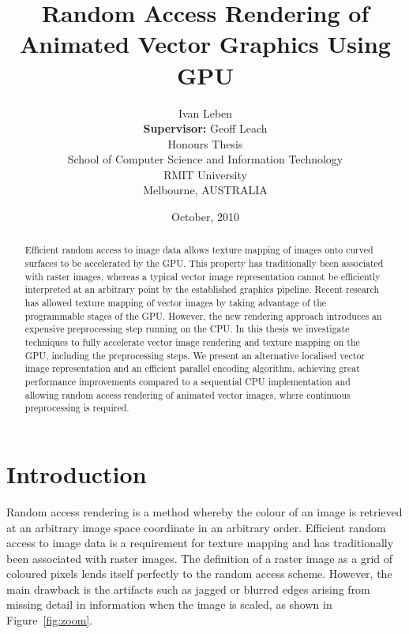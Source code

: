 \documentclass[11pt,a4paper,twoside]{article}
\newcommand{\student}{Ivan Leben}
\newcommand{\topic}{Random Access Rendering of Animated Vector Graphics Using GPU}
\begin{document}
\title{{\sc \topic}}
\author
{
{\sc \student}
\\[3mm] {\bf Supervisor:} {\sc Geoff Leach}
\\[5mm] Honours Thesis
\\[5mm] School of Computer Science and Information Technology
\\ RMIT University 
\\ Melbourne, AUSTRALIA
}
\date {October, 2010}
\maketitle

\begin{abstract}
Efficient random access to image data allows texture mapping of images onto curved surfaces to be accelerated by the GPU. This property has traditionally been associated with raster images, whereas a typical vector image representation cannot be efficiently interpreted at an arbitrary point by the established graphics pipeline. Recent research has allowed texture mapping of vector images by taking advantage of the programmable stages of the GPU. However, the new rendering approach introduces an expensive preprocessing step running on the CPU. In this thesis we investigate techniques to fully accelerate vector image rendering and texture mapping on the GPU, including the preprocessing steps. We present an alternative localised vector image representation and an efficient parallel encoding algorithm, achieving great performance improvements compared to a sequential CPU implementation and allowing random access rendering of animated vector images, where continuous preprocessing is required.
\end{abstract}

\newpage
\tableofcontents
\newpage

\pagestyle{fancy}

\section{Introduction}

Random access rendering is a method whereby the colour of an image is retrieved at an arbitrary image space coordinate in an arbitrary order. Efficient random access to image data is a requirement for texture mapping and has traditionally been associated with raster images. The definition of a raster image as a grid of coloured pixels lends itself perfectly to the random access scheme. However, the main drawback is the artifacts such as jagged or blurred edges arising from missing detail in information when the image is scaled, as shown in Figure~\ref{fig:zoom}.
\end{document}
